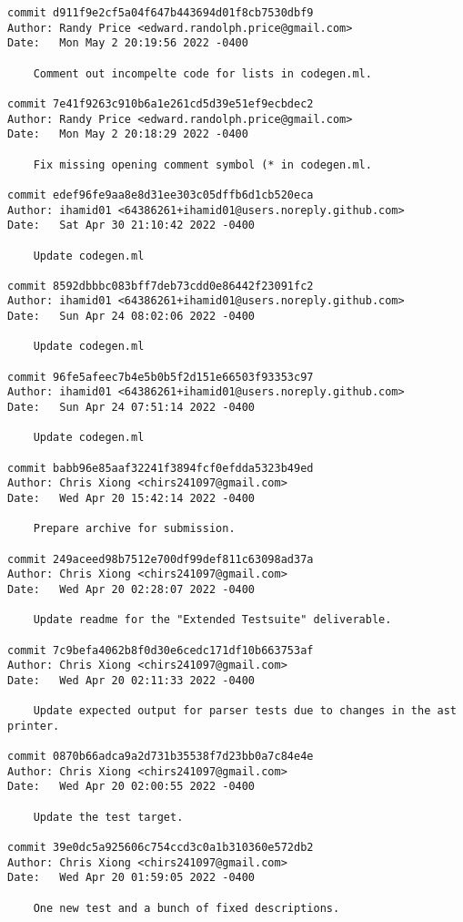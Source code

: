 {\begin{verbatim}
commit d911f9e2cf5a04f647b443694d01f8cb7530dbf9
Author: Randy Price <edward.randolph.price@gmail.com>
Date:   Mon May 2 20:19:56 2022 -0400

    Comment out incompelte code for lists in codegen.ml.

commit 7e41f9263c910b6a1e261cd5d39e51ef9ecbdec2
Author: Randy Price <edward.randolph.price@gmail.com>
Date:   Mon May 2 20:18:29 2022 -0400

    Fix missing opening comment symbol (* in codegen.ml.

commit edef96fe9aa8e8d31ee303c05dffb6d1cb520eca
Author: ihamid01 <64386261+ihamid01@users.noreply.github.com>
Date:   Sat Apr 30 21:10:42 2022 -0400

    Update codegen.ml

commit 8592dbbbc083bff7deb73cdd0e86442f23091fc2
Author: ihamid01 <64386261+ihamid01@users.noreply.github.com>
Date:   Sun Apr 24 08:02:06 2022 -0400

    Update codegen.ml

commit 96fe5afeec7b4e5b0b5f2d151e66503f93353c97
Author: ihamid01 <64386261+ihamid01@users.noreply.github.com>
Date:   Sun Apr 24 07:51:14 2022 -0400

    Update codegen.ml

commit babb96e85aaf32241f3894fcf0efdda5323b49ed
Author: Chris Xiong <chirs241097@gmail.com>
Date:   Wed Apr 20 15:42:14 2022 -0400

    Prepare archive for submission.

commit 249aceed98b7512e700df99def811c63098ad37a
Author: Chris Xiong <chirs241097@gmail.com>
Date:   Wed Apr 20 02:28:07 2022 -0400

    Update readme for the "Extended Testsuite" deliverable.

commit 7c9befa4062b8f0d30e6cedc171df10b663753af
Author: Chris Xiong <chirs241097@gmail.com>
Date:   Wed Apr 20 02:11:33 2022 -0400

    Update expected output for parser tests due to changes in the ast printer.

commit 0870b66adca9a2d731b35538f7d23bb0a7c84e4e
Author: Chris Xiong <chirs241097@gmail.com>
Date:   Wed Apr 20 02:00:55 2022 -0400

    Update the test target.

commit 39e0dc5a925606c754ccd3c0a1b310360e572db2
Author: Chris Xiong <chirs241097@gmail.com>
Date:   Wed Apr 20 01:59:05 2022 -0400

    One new test and a bunch of fixed descriptions.


\end{verbatim}}
